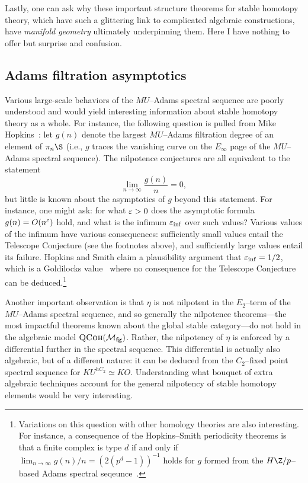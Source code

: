 Lastly, one can ask why these important structure theorems for stable homotopy theory, which have such a glittering link to complicated algebraic constructions, have \emph{manifold geometry} ultimately underpinning them.  Here I have nothing to offer but surprise and confusion.








\subsection*{Adams filtration asymptotics}

Various large-scale behaviors of the \(MU\)--Adams spectral sequence are poorly understood and would yield interesting information about stable homotopy theory as a whole.  For instance, the following question is pulled from Mike Hopkins~\cite[Section 10]{HopkinsOnRavenel}: let \(g(n)\) denote the largest \(MU\)--Adams filtration degree of an element of \(\pi_n \S\) (i.e., \(g\) traces the vanishing curve on the \(E_\infty\) page of the \(MU\)--Adams spectral sequence).  The nilpotence conjectures are all equivalent to the statement \[\lim_{n \to \infty} \frac{g(n)}{n} = 0,\] but little is known about the asymptotics of \(g\) beyond this statement.  For instance, one might ask: for what \(\varepsilon > 0\) does the asymptotic formula \(g(n) = O(n^{\varepsilon})\) hold, and what is the infimum \(\varepsilon_{\inf}\) over such values?  Various values of the infimum have various consequences: sufficiently small values entail the Telescope Conjecture (see the footnotes above), and sufficiently large values entail its failure.  Hopkins and Smith claim a plausibility argument that \(\varepsilon_{\inf} = 1/2\), which is a Goldilocks value~\cite{Dicke} where no consequence for the Telescope Conjecture can be deduced.\footnote{Variations on this question with other homology theories are also interesting.  For instance, a consequence of the Hopkins--Smith periodicity theorems is that a finite complex is type \(d\) if and only if \(\lim_{n \to \infty} g(n) / n = (2(p^d-1))^{-1}\) holds for \(g\) formed from the \(H\Z/p\)--based Adams spectral seqeunce~\cite[Section 3.5]{HopkinsICMZurich}.}

Another important observation is that \(\eta\) is not nilpotent in the \(E_2\)--term of the \(MU\)--Adams spectral sequence, and so generally the nilpotence theorems---the most impactful theorems known about the global stable category---do not hold in the algebraic model \(\normalfont\textsc{QCoh}(\mathcal{M}_{\mathbf{fg}})\).  Rather, the nilpotency of \(\eta\) is enforced by a differential further in the spectral sequence.  This differential is actually also algebraic, but of a different nature: it can be deduced from the \(C_2\)--fixed point spectral sequence for \(KU^{hC_2} \simeq KO\).  Understanding what bouquet of extra algebraic techniques account for the general nilpotency of stable homotopy elements would be very interesting.

